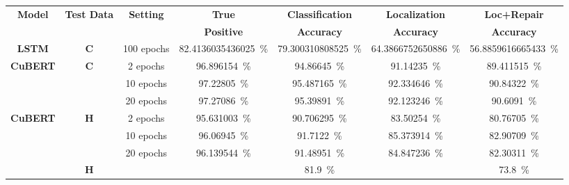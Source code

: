 \documentclass{article}
\newcommand{\BERTforCode}{CuBERT\xspace}
\newcommand{\update}[1]{#1}
\begin{document}
\begin{table*}
    \centering
{}\begin{tabular}{c|c|c|c|c|c|c}
    \toprule \textbf{Model} & \textbf{Test Data} & \textbf{Setting} & \textbf{True} & \textbf{Classification} & \textbf{Localization} & \textbf{Loc+Repair}\\
&    & & \textbf{Positive} & \textbf{Accuracy} & \textbf{Accuracy} & \textbf{Accuracy}\\
    \midrule
    \textbf{LSTM} & \textbf{C} & 100 epochs &
\SI{82.4136035436025}{\percent}&	\SI{79.300310808525}{\percent}&	\SI{64.3866752650886}{\percent}&	\SI{56.8859616665433}{\percent}
\\
    \midrule
    \multirow{3}{*}{\textbf{\BERTforCode{}}} & \multirow{3}{*}{\textbf{C}} & 2 epochs &
\SI{96.896154}{\percent}&	\SI{94.86645}{\percent}&	\SI{91.14235}{\percent}&	\SI{89.411515}{\percent}
\\
    && 10 epochs &
\SI{97.22805}{\percent}&	\SI{95.487165}{\percent}&	\SI{92.334646}{\percent}&	\SI{90.84322}{\percent}
\\
    && 20 epochs &
\SI{97.27086}{\percent}&	\SI{95.39891}{\percent}&	\SI{92.123246}{\percent}&	\SI{90.6091}{\percent}
\\
    \midrule\midrule
\multirow{3}{*}{\textbf{\BERTforCode{}}} & \multirow{3}{*}{\textbf{H}}& 2 epochs &
\SI{95.631003}{\percent}&	\SI{90.706295}{\percent}&	\SI{83.50254}{\percent}&	\SI{80.76705}{\percent}
\\
    &  & 10 epochs &
\SI{96.06945}{\percent}&	\SI{91.7122}{\percent}&	\SI{85.373914}{\percent}&	\SI{82.90709}{\percent}
\\
    &  & 20 epochs &
\SI{96.139544}{\percent}&	\SI{91.48951}{\percent}&	\SI{84.847236}{\percent}&	\SI{82.30311}{\percent}
\\
    \midrule
    \citet{hellendoorn2020global} & \textbf{H} &  &
&	\SI{81.9}{\percent}&	&	\SI{73.8}{\percent}
\\
    \bottomrule
\end{tabular}
    \caption{\update{Variable-misuse localization and repair task. Comparison of the LSTM+pointer model~\cite{DBLP:journals/corr/abs-1904-01720} to our fine-tuned \BERTforCode{}+pointer model. We also show results on the test data by \citet{hellendoorn2020global} computed by us and reported by the authors in their Table~1. In the Test Data column, \textbf{C} means our \BERTforCode test dataset, and \textbf{H} means the test dataset used  by \citet{hellendoorn2020global}.}}
    \label{tab:varmisuse-pointer}
\end{table*}
\end{document}
